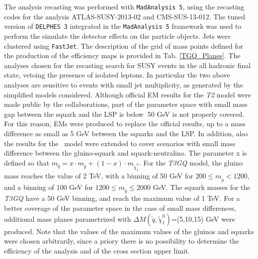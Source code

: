 \documentclass[epj,nopacs,fleqn]{svjour}
\begin{document}
%
The analysis recasting was performed with \texttt{MadAnalysis 5}, using the recasting codes for the analysis ATLAS-SUSY-2013-02\cite{ATLAS-SUSY-2013-02MA5,ATLAS-SUSY-2013-02VALIDATION} and CMS-SUS-13-012\cite{CMS-SUS-13-012MA5,CMS-SUS-13-012VALIDATION}. The tuned version of \texttt{DELPHES 3} integrated in the \texttt{MadAnalysis 5} framework was used to perform the simulate the detector effects on the particle objects. Jets were clustered using \texttt{FastJet}\cite{Cacciari:2011ma}.
%
The description of the grid of mass points defined for the production of the efficiency maps is provided in Tab. \ref{TGQ_Planes}. The analyses chosen for the recasting search for SUSY events in the all hadronic final state, vetoing the presence of isolated leptons. In particular the two above analyses are sensitive to events with small jet multiplicity, as generated by the simplified models considered. Although official EM results for the \textit{T2} model were made public by the collaborations, part of the parameter space with small mass gap between the squark and the LSP is below $~$50 GeV is not properly covered. For this reason, EMs were produced to replace the official results, up to a mass difference as small as 5 GeV between the squarks and the LSP. In addition, also the results for the \Tfive~model were extended to cover scenarios with small mass difference between the gluino-squark and squark-neutralino. The parameter x is defined so that $m_{\tilde q}= x\cdot m_{\tilde g} + (1-x)\cdot m_{\tilde \chi_1 ^0}$. For the \textit{T3GQ} model, the gluino mass reaches the value of 2 TeV, with a binning of 50 GeV for $200 \leq m_{\tilde g} < 1200$, and a binning of 100 GeV for $1200 \leq m_{\tilde g}  \leq 2000$ GeV. The squark masses for the \textit{T3GQ} have a 50 GeV binning, and reach the maximum value of 1 TeV. For a better coverage of the parameter space in the case of small mass differences, additional mass planes parametrized with $\Delta M ( \tilde q, \tilde \chi _1 ^0)$=(5,10,15) GeV were produced. Note that the values of the maximum values of the gluinos and squarks were chosen arbitrarily, since a priory there is no possibility to determine the efficiency of the analysis and of the cross section upper limit. 
%
\end{document}
